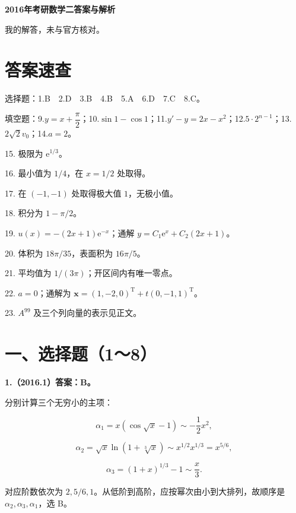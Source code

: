 \documentclass[UTF8,11pt,fontset=windows]{ctexart}
\begin{document}
{\LARGE\bfseries 2016年考研数学二答案与解析\par}\vspace{6pt}

\begingroup\color{gray}我的解答，未与官方核对。\par\endgroup

\section*{答案速查}

\begingroup\color{gray}选择题：1.B　2.D　3.B　4.B　5.A　6.D　7.C　8.C。\par\endgroup

\begingroup\color{gray}填空题：9.$y=x+\dfrac\pi2$；10.$\sin1-\cos1$；11.$y'-y=2x-x^2$；12.$5\cdot2^{n-1}$；13.$2\sqrt2v_0$；14.$a=2$。\par\endgroup

15. 极限为 $\mathrm e^{1/3}$。

16. 最小值为 $1/4$，在 $x=1/2$ 处取得。

17. 在 $(-1,-1)$ 处取得极大值 $1$，无极小值。

18. 积分为 $1-\pi/2$。

19. $u(x)=-(2x+1)\mathrm e^{-x}$；通解 $y=C_1\mathrm e^x+C_2(2x+1)$。

20. 体积为 $18\pi/35$，表面积为 $16\pi/5$。

21. 平均值为 $1/(3\pi)$；开区间内有唯一零点。

22. $a=0$；通解为 $\boldsymbol x=(1,-2,0)^{\mathrm T}+t(0,-1,1)^{\mathrm T}$。

23. $A^{99}$ 及三个列向量的表示见正文。

\clearpage

\section*{一、选择题（1～8）}

\textbf{1.（2016.1）答案：B。}

分别计算三个无穷小的主项：

$$
\alpha_1=x(\cos\sqrt x-1)\sim-\frac12x^2,
$$

$$
\alpha_2=\sqrt x\ln(1+\sqrt[3]x)\sim x^{1/2}x^{1/3}=x^{5/6},
$$

$$
\alpha_3=(1+x)^{1/3}-1\sim\frac x3.
$$

对应阶数依次为 $2,5/6,1$。从低阶到高阶，应按幂次由小到大排列，故顺序是 $\alpha_2,\alpha_3,\alpha_1$，选 B。
\end{document}
